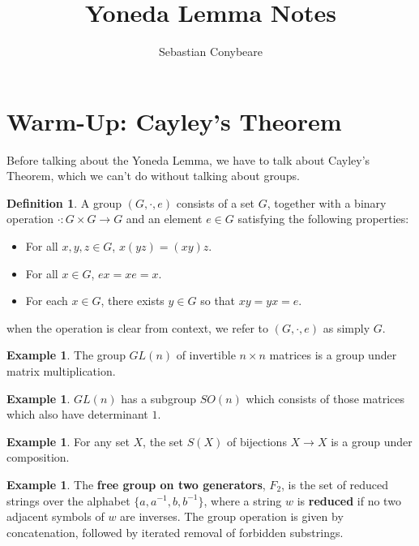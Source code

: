 \documentclass[11pt]{article}
\theoremstyle{plain}
\theoremstyle{definition}
\newtheorem{exmp}[thm]{Example}
\newtheorem{defn}[thm]{Definition}
\begin{document}
\author{Sebastian Conybeare}
\title{Yoneda Lemma Notes}
\maketitle

\section{Warm-Up: Cayley's Theorem}
Before talking about the Yoneda Lemma, we have to talk about Cayley's Theorem, which we can't do without talking about groups.

\begin{defn}
    A group $(G,\cdot,e)$ consists of a set $G$, together with a binary operation $\cdot : G \times G \to G$ and an element $e \in G$ satisfying the following properties:
    \begin{itemize}
        \item
            For all $x,y,z \in G$, $x(yz) = (xy)z$.
        \item
            For all $x \in G$, $ex = xe = x$.
        \item
            For each $x \in G$, there exists $y \in G$ so that $xy = yx = e$.
    \end{itemize}
\end{defn}
when the operation is clear from context, we refer to $(G,\cdot,e)$ as simply $G$.

\begin{exmp}
    The group $GL(n)$ of invertible $n \times n$ matrices is a group under matrix multiplication.
\end{exmp}

\begin{exmp}
    $GL(n)$ has a subgroup $SO(n)$ which consists of those matrices which also have determinant $1$.
\end{exmp}

\begin{exmp}
    For any set $X$, the set $S(X)$ of bijections $X \to X$ is a group under composition.
\end{exmp}

\begin{exmp}
    The \textbf{free group on two generators}, $F_2$, is the set of reduced strings over the alphabet $\{a,a^{-1},b,b^{-1}\}$, where a string $w$ is \textbf{reduced} if no two adjacent symbols of $w$ are inverses. The group operation is given by concatenation, followed by iterated removal of forbidden substrings.
\end{exmp}
\end{document}

